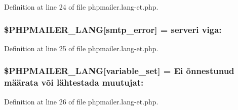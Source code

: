 Definition at line 24 of file phpmailer.\+lang-\/et.\+php.

\subsubsection[{\texorpdfstring{\$\+P\+H\+P\+M\+A\+I\+L\+E\+R\+\_\+\+L\+A\+NG}{$PHPMAILER_LANG}}]{\setlength{\rightskip}{0pt plus 5cm}\$P\+H\+P\+M\+A\+I\+L\+E\+R\+\_\+\+L\+A\+NG\mbox{[}\textquotesingle{}smtp\+\_\+error\textquotesingle{}\mbox{]} =  serveri viga\+: \textquotesingle{}}\hypertarget{phpmailer_8lang-et_8php_a7d9cffba1e669c845f8a4c891ee50064}{}\label{phpmailer_8lang-et_8php_a7d9cffba1e669c845f8a4c891ee50064}


Definition at line 25 of file phpmailer.\+lang-\/et.\+php.

\subsubsection[{\texorpdfstring{\$\+P\+H\+P\+M\+A\+I\+L\+E\+R\+\_\+\+L\+A\+NG}{$PHPMAILER_LANG}}]{\setlength{\rightskip}{0pt plus 5cm}\$P\+H\+P\+M\+A\+I\+L\+E\+R\+\_\+\+L\+A\+NG\mbox{[}\textquotesingle{}variable\+\_\+set\textquotesingle{}\mbox{]} = \textquotesingle{}Ei õnnestunud määrata või lähtestada muutujat\+: \textquotesingle{}}\hypertarget{phpmailer_8lang-et_8php_af795debc7a739d038742691c358d9032}{}\label{phpmailer_8lang-et_8php_af795debc7a739d038742691c358d9032}


Definition at line 26 of file phpmailer.\+lang-\/et.\+php.

